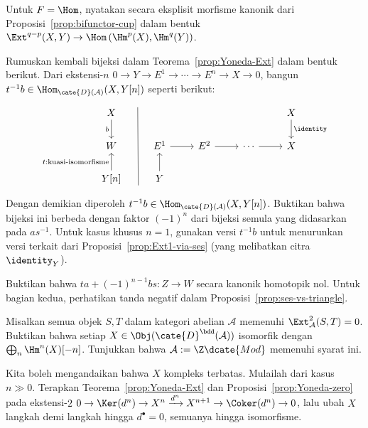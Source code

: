 \begin{Exercises}
	\item Untuk $F=\Hom$, nyatakan secara eksplisit morfisme kanonik dari
	Proposisi~\ref{prop:bifunctor-cup} dalam bentuk
	$\Ext^{q-p}(X,Y)\to\Hom\left(\Hm^p(X),\Hm^q(Y)\right)$.

	\item Rumuskan kembali bijeksi dalam Teorema~\ref{prop:Yoneda-Ext} dalam bentuk
	berikut. Dari ekstensi-$n$
	$0\to Y\to E^1\to\cdots\to E^n\to X\to0$, bangun
	$t^{-1}b\in\Hom_{\cate{D}(\mathcal{A})}(X,Y[n])$ seperti berikut:
	\[\begin{tikzcd}
		X \arrow[d, "b"']\arrow[phantom, r, "" {name=A, yshift=2ex}] & {} & & & X \arrow[d, "\identity"] \\
		W & E^1 \arrow[r] & E^2 \arrow[r] & \cdots \arrow[r] & X \\
		Y[n] \arrow[u, "{t: \text{kuasi-isomorfisme}}"] \arrow[phantom, r, "" {name=B, yshift=-2ex}] & Y \arrow[u] & & &
		\arrow[dash, from=A, to=B]
	\end{tikzcd}\]
	Dengan demikian diperoleh
	$t^{-1}b\in\Hom_{\cate{D}(\mathcal{A})}(X,Y[n])$. Buktikan bahwa bijeksi
	ini berbeda dengan faktor $(-1)^n$ dari bijeksi semula yang didasarkan
	pada $as^{-1}$. Untuk kasus khusus $n=1$, gunakan versi $t^{-1}b$ untuk
	menurunkan versi terkait dari Proposisi~\ref{prop:Ext1-via-ses} (yang
	melibatkan citra $\identity_Y$).
	
	\begin{hint}
		Buktikan bahwa $ta+(-1)^{n-1}bs:Z\to W$ secara kanonik homotopik nol.
		Untuk bagian kedua, perhatikan tanda negatif dalam
		Proposisi~\ref{prop:ses-vs-triangle}.
	\end{hint}

	\item Misalkan semua objek $S,T$ dalam kategori abelian $\mathcal{A}$
	memenuhi $\Ext^2_{\mathcal{A}}(S,T)=0$. Buktikan bahwa setiap
	$X\in\Obj(\cate{D}^{\bdd}(\mathcal{A}))$ isomorfik dengan
	$\bigoplus_n\Hm^n(X)[-n]$. Tunjukkan bahwa
	$\mathcal{A}:=\Z\dcate{Mod}$ memenuhi syarat ini.
	
	\begin{hint}
		Kita boleh mengandaikan bahwa $X$ kompleks terbatas. Mulailah dari kasus
		$n\gg0$. Terapkan Teorema~\ref{prop:Yoneda-Ext} dan
		Proposisi~\ref{prop:Yoneda-zero} pada ekstensi-$2$
		$0\to\Ker(d^n)\to X^n\xrightarrow{d^n}X^{n+1}\to\Coker(d^n)\to0$,
		lalu ubah $X$ langkah demi langkah hingga $d^\bullet=0$, semuanya hingga
		isomorfisme.
	\end{hint}


\end{Exercises}
